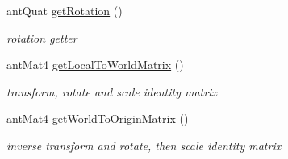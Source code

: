 \begin{DoxyCompactItemize}
ant\+Quat \hyperlink{classant_configuration_a88f393f030510d9893a7488c73332854}{get\+Rotation} ()
\begin{DoxyCompactList}\small\item\em rotation getter \end{DoxyCompactList}\item 
ant\+Mat4 \hyperlink{classant_configuration_a800093a1fb99f84d955061772f60abec}{get\+Local\+To\+World\+Matrix} ()
\begin{DoxyCompactList}\small\item\em transform, rotate and scale identity matrix \end{DoxyCompactList}\item 
ant\+Mat4 \hyperlink{classant_configuration_a06e400aad271a2d541a5e5892cda0ccf}{get\+World\+To\+Origin\+Matrix} ()
\begin{DoxyCompactList}\small\item\em inverse transform and rotate, then scale identity matrix \end{DoxyCompactList}\end{DoxyCompactItemize}
